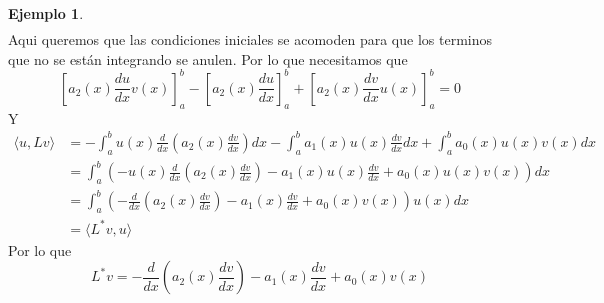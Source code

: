 \documentclass[11pt]{book}
\theoremstyle{plain}
\theoremstyle{definition}
\newtheorem{ejemplo}[proposición]{Ejemplo}
\begin{document}
\begin{ejemplo}
\begin{align*}
        \end{align*}
        Aqui queremos que las condiciones iniciales se acomoden para que los terminos que no se están integrando se anulen. Por lo que necesitamos que
        \[
            \left[a_2(x)\frac{du}{dx}v(x)\right]_{a}^{b} - \left[a_2(x)\frac{du}{dx}\right]_{a}^{b} + \left[a_2(x)\frac{dv}{dx}u(x)\right]_{a}^{b} = 0
        \]
        Y
        \begin{align*}
            \langle u, Lv \rangle &= - \int_{a}^{b} u(x)\frac{d}{dx}\left(a_2(x)\frac{dv}{dx}\right)dx - \int_{a}^{b} a_1(x)u(x)\frac{dv}{dx}dx + \int_{a}^{b} a_0(x)u(x)v(x)dx\\
            &= \int_{a}^{b} \left(-u(x)\frac{d}{dx}\left(a_2(x)\frac{dv}{dx}\right) - a_1(x)u(x)\frac{dv}{dx} + a_0(x)u(x)v(x)\right)dx\\
            &= \int_{a}^{b} \left(-\frac{d}{dx}\left(a_2(x)\frac{dv}{dx}\right) - a_1(x)\frac{dv}{dx} + a_0(x)v(x)\right)u(x)dx\\
            &= \langle L^{*}v, u \rangle
        \end{align*}
        Por lo que
        \[
            L^{*}v = -\frac{d}{dx}\left(a_2(x)\frac{dv}{dx}\right) - a_1(x)\frac{dv}{dx} + a_0(x)v(x)
        \]
    \end{ejemplo}
\end{document}
